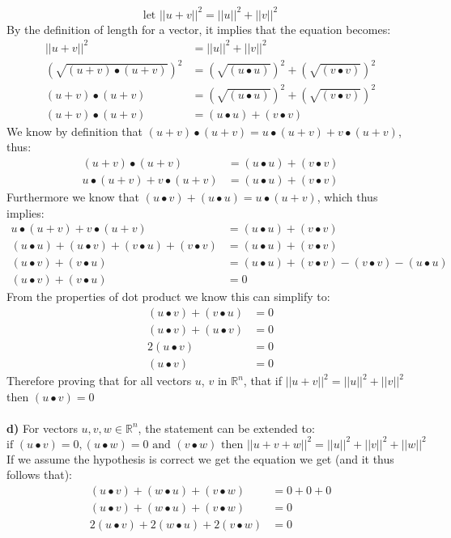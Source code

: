 \documentclass[11pt]{article}
\begin{document}
\[ \text{let } ||u+v||^2 = ||u||^2 + ||v||^2 \]
By the definition of length for a vector, it implies that the equation becomes: 
\begin{align*}
||u + v||^2 &=||u||^2 + ||v||^2 \\
(\sqrt{(u + v) \bullet (u + v)})^2 &= (\sqrt{(u \bullet u)})^2 + (\sqrt{(v \bullet v)})^2 \\
(u + v) \bullet (u + v) &= (\sqrt{(u \bullet u)})^2 + (\sqrt{(v \bullet v)})^2 \\
(u + v) \bullet (u + v) &= (u \bullet u) + (v \bullet v) 
\end{align*}
We know by definition that $(u + v) \bullet (u + v)  = u \bullet (u + v) +  v \bullet (u + v)$, thus:
\begin{align*}
(u + v) \bullet (u + v) &= (u \bullet u) + (v \bullet v) \\
u \bullet (u + v) +  v \bullet (u + v)   &= (u \bullet u) + (v \bullet v)  
\end{align*}
Furthermore we know that $(u \bullet v) + (u \bullet u) = u \bullet (u+ v)$, which thus implies:
\begin{align*}
u \bullet (u + v) +  v \bullet (u + v)   &= (u \bullet u) + (v \bullet v) \\
(u \bullet u) + (u \bullet v)  + (v \bullet u) + (v \bullet v)   &= (u \bullet u) + (v \bullet v) \\
(u \bullet v)  + (v \bullet u) &= (u \bullet u) + (v \bullet v) -   (v \bullet v)  - (u \bullet u)\\
(u \bullet v)  + (v \bullet u) &= 0
\end{align*}
From the properties of dot product we know this can simplify to:
\begin{align*}
(u \bullet v)  + (v \bullet u) &= 0\\
(u \bullet v)  + (u \bullet v) &= 0\\
2(u \bullet v) &= 0\\
(u \bullet v) &= 0
\end{align*}
Therefore proving that for all vectors $u$, $v$ in  $\mathbb{R}^n$, that if $||u + v||^2 =||u||^2 + ||v||^2$ then $(u \bullet v) = 0$\\\\
\textbf{d)} For vectors $u,v,w \in \mathbb{R}^n$, the statement can be extended to:
\[ \text{if } (u \bullet v) = 0, (u \bullet w) = 0 \text{ and } (v \bullet w) \text{ then } || u + v + w ||^2 = ||u||^2 + ||v||^2 + ||w||^2\]
If we assume the hypothesis is correct we get the equation we get (and it thus follows that):
\begin{align*}
(u \bullet v)  + (w \bullet u) + (v \bullet w) &= 0 + 0 + 0\\
(u \bullet v)  + (w \bullet u) + (v \bullet w)  &= 0 \\
2(u \bullet v)  + 2(w \bullet u) + 2(v \bullet w)  &= 0
\end{align*}
\end{document}
